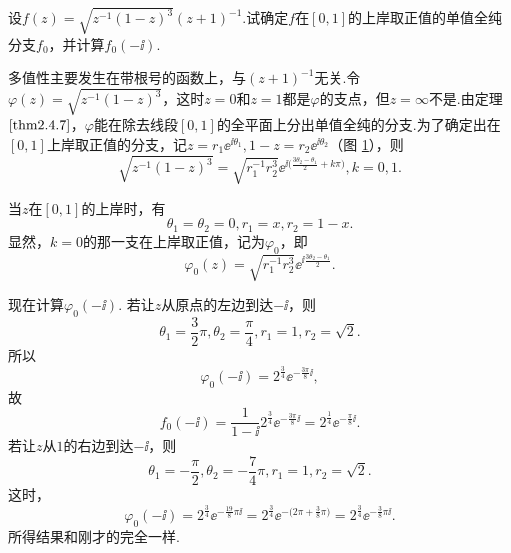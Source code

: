 \begin{example}\label{exam2.4.9}
  设$f(z)=\sqrt{z^{-1}(1-z)^3}(z+1)^{-1}$.试确定$f$在$[0,1]$的上岸取正值的单值全纯分支$f_0$，并计算$f_0(-\ii)$.
\end{example}
\begin{solution}
  多值性主要发生在带根号的函数上，与$(z+1)^{-1}$无关.令$\varphi(z)=\sqrt{z^{-1}(1-z)^3}$，这时$z=0$和$z=1$都是$\varphi$的支点，但$z=\infty$不是.由定理  $\ref{thm2.4.7}$，$\varphi$能在除去线段$[0,1]$的全平面上分出单值全纯的分支.为了确定出在$[0,1]$上岸取正值的分支，记$z=r_1\ee^{\ii\theta_1},1-z=r_2\ee^{\ii\theta_2}$（图 \ref{fig2.9}），则
  \[
    \sqrt{z^{-1}(1-z)^3} = \sqrt{r_1^{-1}r_2^3}
    \ee^{\ii\big(\frac{3\theta_2-\theta_1}2+k\pi\big)},k=0,1.
  \]
  \begin{figure}[!ht]
    \centering
    \caption{\label{fig2.9}}
  \end{figure}
  当$z$在$[0,1]$的上岸时，有
  \[
    \theta_1 = \theta_2 = 0,r_1 = x,r_2 = 1-x.
  \]
  显然，$k=0$的那一支在上岸取正值，记为$\varphi_0$，即
  \[
    \varphi_0(z) = \sqrt{r_1^{-1}r_2^3}
    \ee^{\ii\frac{3\theta_2-\theta_1}2}.
  \]

  现在计算$\varphi_0(-\ii)$. 若让$z$从原点的左边到达$-\ii$，则
  \[
    \theta_1 = \frac32\pi,\theta_2 = \frac\pi4,r_1 = 1,r_2 = \sqrt2.
  \]
  所以
  \[
    \varphi_0(-\ii) = 2^{\frac34}\ee^{-\frac{3\pi}8\ii},
  \]
  故
  \[
    f_0(-\ii) = \frac1{1-\ii}2^{\frac34}\ee^{-\frac{3\pi}8\ii} = 2^{\frac14}\ee^{
    -\frac\pi8\ii}.
  \]
  若让$z$从$1$的右边到达$-\ii$，则
  \[
    \theta_1 = -\frac\pi2,\theta_2 = -\frac74\pi,r_1 = 1,r_2 = \sqrt2.
  \]
  这时，
  \[
    \varphi_0(-\ii) = 2^{\frac34}\ee^{-\frac{19}8\pi\ii} = 2^{\frac34}\ee^{-
    \big(2\pi+\frac38\pi\big)} = 2^{\frac34}\ee^{-\frac38\pi\ii}.
  \]
  所得结果和刚才的完全一样.
\end{solution}

